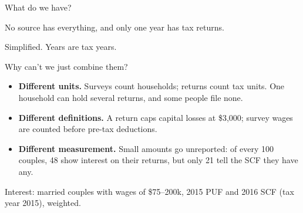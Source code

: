 \documentclass[11pt,aspectratio=169]{beamer}
\newcommand{\slidenote}[1]{\par\vfill{\scriptsize\color{yalegrey}#1}}
\begin{document}
\begin{frame}{What do we have?}

  \vspace{0.6em}
  No source has everything, and only one year has tax returns.
  \slidenote{Simplified. Years are tax years.}
\end{frame}

\begin{frame}{Why can't we just combine them?}
  \begin{itemize}
    \item \textbf{Different units.} Surveys count households; returns count tax units.
          One household can hold several returns, and some people file none.
    \vspace{0.6em}
    \item \textbf{Different definitions.} A return caps capital losses at \$3,000;
          survey wages are counted before pre-tax deductions.
    \vspace{0.6em}
    \item \textbf{Different measurement.} Small amounts go unreported: of every 100 couples,
          48 show interest on their returns, but only 21 tell the SCF they have any.
  \end{itemize}
  \slidenote{Interest: married couples with wages of \$75--200k, 2015 PUF and 2016 SCF (tax year 2015), weighted.}
\end{frame}
\end{document}
